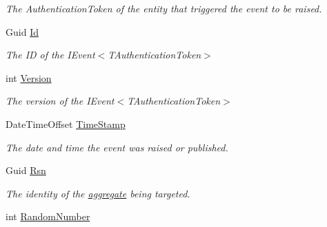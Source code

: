\begin{DoxyCompactItemize}
\begin{DoxyCompactList}\small\item\em The Authentication\+Token of the entity that triggered the event to be raised. \end{DoxyCompactList}\item 
Guid \hyperlink{classCqrs_1_1MongoDB_1_1Tests_1_1Integration_1_1MongoDbSnapshotStoreTests_1_1RandomNumberEvent_a6b8dedada6f38064e3e08044dd34fe08_a6b8dedada6f38064e3e08044dd34fe08}{Id}
\begin{DoxyCompactList}\small\item\em The ID of the I\+Event$<$\+T\+Authentication\+Token$>$ \end{DoxyCompactList}\item 
int \hyperlink{classCqrs_1_1MongoDB_1_1Tests_1_1Integration_1_1MongoDbSnapshotStoreTests_1_1RandomNumberEvent_a4c08548f68e367e27ac1cba36f52568a_a4c08548f68e367e27ac1cba36f52568a}{Version}
\begin{DoxyCompactList}\small\item\em The version of the I\+Event$<$\+T\+Authentication\+Token$>$ \end{DoxyCompactList}\item 
Date\+Time\+Offset \hyperlink{classCqrs_1_1MongoDB_1_1Tests_1_1Integration_1_1MongoDbSnapshotStoreTests_1_1RandomNumberEvent_a6a6e1833a12640068a4c6f338f4e9394_a6a6e1833a12640068a4c6f338f4e9394}{Time\+Stamp}
\begin{DoxyCompactList}\small\item\em The date and time the event was raised or published. \end{DoxyCompactList}\item 
Guid \hyperlink{classCqrs_1_1MongoDB_1_1Tests_1_1Integration_1_1MongoDbSnapshotStoreTests_1_1RandomNumberEvent_a0dead4c3dd08cb0e785ee90b2e056bdc_a0dead4c3dd08cb0e785ee90b2e056bdc}{Rsn}
\begin{DoxyCompactList}\small\item\em The identity of the \hyperlink{}{aggregate} being targeted. \end{DoxyCompactList}\item 
int \hyperlink{classCqrs_1_1MongoDB_1_1Tests_1_1Integration_1_1MongoDbSnapshotStoreTests_1_1RandomNumberEvent_a65d03bdfa463e49a50ce52720ab61334_a65d03bdfa463e49a50ce52720ab61334}{Random\+Number}
\end{DoxyCompactItemize}


